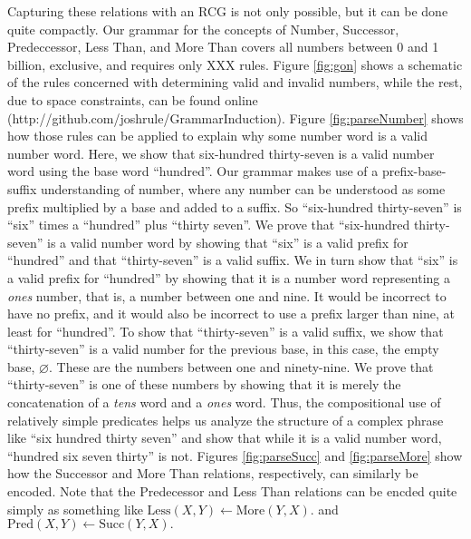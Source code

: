 \documentclass[10pt,letterpaper]{article}
\begin{document}
Capturing these relations with an RCG is not only possible, but it can
be done quite compactly. Our grammar for the concepts of Number,
Successor, Predeccessor, Less Than, and More Than covers all numbers
between 0 and 1 billion, exclusive, and requires only XXX
rules. Figure \ref{fig:gon} shows a schematic of the rules concerned
with determining valid and invalid numbers, while the rest, due to
space constraints, can be found online
(http://github.com/joshrule/GrammarInduction). Figure
\ref{fig:parseNumber} shows how those rules can be applied to explain
why some number word is a valid number word. Here, we show that
six-hundred thirty-seven is a valid number word using the base word
``hundred''. Our grammar makes use of a prefix-base-suffix
understanding of number, where any number can be understood as some
prefix multiplied by a base and added to a suffix. So ``six-hundred
thirty-seven'' is ``six'' times a ``hundred'' plus ``thirty
seven''. We prove that ``six-hundred thirty-seven'' is a valid number
word by showing that ``six'' is a valid prefix for ``hundred'' and
that ``thirty-seven'' is a valid suffix. We in turn show that ``six''
is a valid prefix for ``hundred'' by showing that it is a number word
representing a \emph{ones} number, that is, a number between one and
nine. It would be incorrect to have no prefix, and it would also be
incorrect to use a prefix larger than nine, at least for
``hundred''. To show that ``thirty-seven'' is a valid suffix, we show
that ``thirty-seven'' is a valid number for the previous base, in this
case, the empty base, $\varnothing$. These are the numbers between one
and ninety-nine. We prove that ``thirty-seven'' is one of these
numbers by showing that it is merely the concatenation of a
\emph{tens} word and a \emph{ones} word. Thus, the compositional use
of relatively simple predicates helps us analyze the structure of a
complex phrase like ``six hundred thirty seven'' and show that while
it is a valid number word, ``hundred six seven thirty'' is not. Figures \ref{fig:parseSucc} and \ref{fig:parseMore} show how the Successor and More Than relations, respectively, can similarly be encoded. Note that the Predecessor and Less Than relations can be encded quite simply as something like $\text{Less}(X,Y) \leftarrow \text{More}(Y,X).$ and  $\text{Pred}(X,Y) \leftarrow \text{Succ}(Y,X).$
\end{document}
